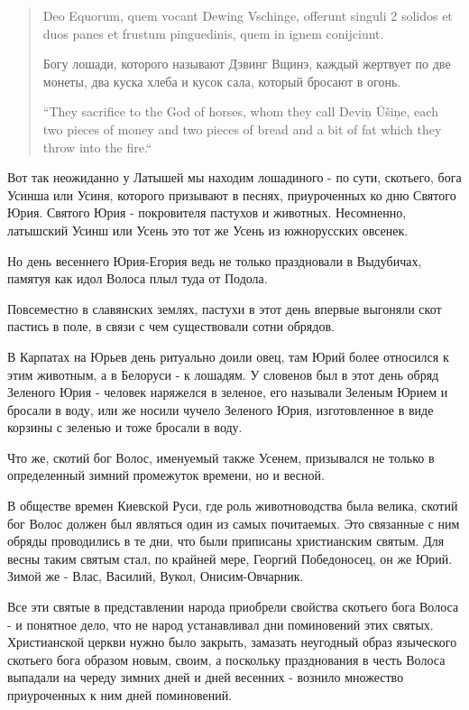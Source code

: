 \documentclass[a5paper,11pt,openany]{article}
\begin{document}
\begin{quotation}
\noindent Deo Equorum, quem vocant Dewing Vschinge, offerunt singuli 2 solidos et duos panes et frustum pinguedinis, quem in ignem conijciunt.

\noindent Богу лошади, которого называют Дэвинг Вщинэ, каждый жертвует по две монеты, два куска хлеба и кусок сала, который бросают в огонь.

\noindent “They sacrifice to the God of horses, whom they call Deviņ Ūšiņe, each two pieces of money and two pieces of bread and a bit of fat which they throw into the fire.“
\end{quotation}

   Вот так неожиданно у Латышей мы находим лошадиного - по сути, скотьего, бога Усинша или Усиня, которого призывают в песнях, приуроченных ко дню Святого Юрия. Святого Юрия - покровителя пастухов и животных. Несомненно, латышский Усинш или Усень это тот же Усень из южнорусских овсенек.

   Но день весеннего Юрия-Егория ведь не только праздновали в Выдубичах, памятуя как идол Волоса плыл туда от Подола. 

   Повсеместно в славянских землях, пастухи в этот день впервые выгоняли скот пастись в поле, в связи с чем существовали сотни обрядов. 

   В Карпатах на Юрьев день ритуально доили овец, там Юрий более относился к этим животным, а в Белоруси - к лошадям. У словенов был в этот день обряд Зеленого Юрия - человек наряжелся в зеленое, его называли Зеленым Юрием и бросали в воду, или же носили чучело Зеленого Юрия, изготовленное в виде корзины с зеленью и тоже бросали в воду.

   Что же, скотий бог Волос, именуемый также Усенем, призывался не только в определенный зимний промежуток времени, но и весной. 

   В обществе времен Киевской Руси, где роль животноводства была велика, скотий бог Волос должен был являться один из самых почитаемых. Это связанные с ним обряды проводились в те дни, что были приписаны христианским святым. Для весны таким святым стал, по крайней мере, Георгий Победоносец, он же Юрий.  Зимой же - Влас, Василий, Вукол, Онисим-Овчарник.

   Все эти святые в представлении народа приобрели свойства скотьего бога Волоса - и понятное дело, что не народ устанавливал дни поминовений этих святых. Христианской церкви нужно было закрыть, замазать неугодный образ языческого скотьего бога образом новым, своим, а поскольку празднования в честь Волоса выпадали на череду зимних дней и дней весенних - вознило множество приуроченных к ним дней поминовений.
\end{document}
